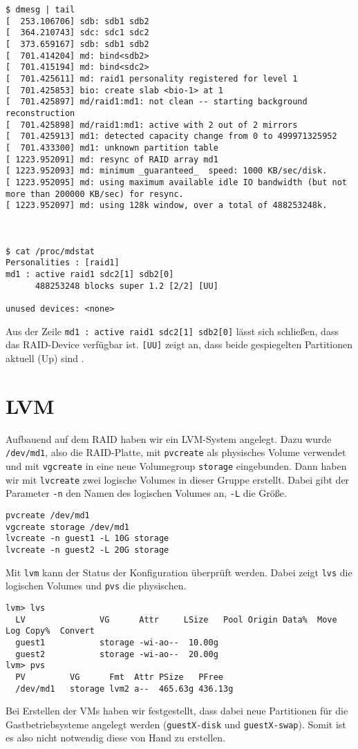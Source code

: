 \begin{verbatim}
$ dmesg | tail
[  253.106706] sdb: sdb1 sdb2
[  364.210743] sdc: sdc1 sdc2
[  373.659167] sdb: sdb1 sdb2
[  701.414204] md: bind<sdb2>
[  701.415194] md: bind<sdc2>
[  701.425611] md: raid1 personality registered for level 1
[  701.425853] bio: create slab <bio-1> at 1
[  701.425897] md/raid1:md1: not clean -- starting background reconstruction
[  701.425898] md/raid1:md1: active with 2 out of 2 mirrors
[  701.425913] md1: detected capacity change from 0 to 499971325952
[  701.433300] md1: unknown partition table
[ 1223.952091] md: resync of RAID array md1
[ 1223.952093] md: minimum _guaranteed_  speed: 1000 KB/sec/disk.
[ 1223.952095] md: using maximum available idle IO bandwidth (but not more than 200000 KB/sec) for resync.
[ 1223.952097] md: using 128k window, over a total of 488253248k.



$ cat /proc/mdstat
Personalities : [raid1] 
md1 : active raid1 sdc2[1] sdb2[0]
      488253248 blocks super 1.2 [2/2] [UU]
      
unused devices: <none>
\end{verbatim}

Aus der Zeile \verb#md1 : active raid1 sdc2[1] sdb2[0]# lässt sich schließen, dass das RAID-Device verfügbar ist. \verb#[UU]# zeigt an, dass beide gespiegelten Partitionen aktuell (Up) sind \cite{wiki_mdstat}.

\section{LVM}
Aufbauend auf dem RAID haben wir ein LVM-System angelegt. Dazu wurde \verb#/dev/md1#, also die RAID-Platte, mit \verb#pvcreate# als physisches Volume verwendet und mit \verb#vgcreate# in eine neue Volumegroup \verb#storage# eingebunden. 
Dann haben wir mit \verb#lvcreate# zwei logische Volumes in dieser Gruppe erstellt. Dabei gibt der Parameter \verb#-n# den Namen des logischen Volumes an, \verb#-L# die Größe. 
\begin{verbatim}
pvcreate /dev/md1 
vgcreate storage /dev/md1
lvcreate -n guest1 -L 10G storage
lvcreate -n guest2 -L 20G storage
\end{verbatim} 
Mit \verb#lvm# kann der Status der Konfiguration überprüft werden. Dabei zeigt \verb#lvs# die logischen Volumes und \verb#pvs# die physischen. 
\setupVerbatimOut
{}
\begin{verbatim}
lvm> lvs
  LV               VG      Attr     LSize   Pool Origin Data%  Move Log Copy%  Convert                                        
  guest1           storage -wi-ao--  10.00g                                           
  guest2           storage -wi-ao--  20.00g                                           
lvm> pvs
  PV         VG      Fmt  Attr PSize   PFree  
  /dev/md1   storage lvm2 a--  465.63g 436.13g
\end{verbatim} 
Bei Erstellen der VMs haben wir festgestellt, dass dabei neue Partitionen für die Gastbetriebsysteme angelegt werden (\verb#guestX-disk# und \verb#guestX-swap#). Somit ist es also nicht notwendig diese von Hand zu erstellen. 

